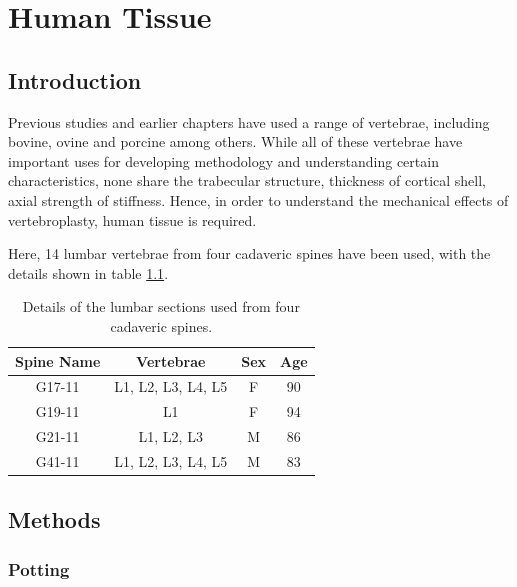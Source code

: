 \chapter{Human Tissue}

\section{Introduction}

Previous studies and earlier chapters have used a range of vertebrae, including bovine, ovine and porcine among others. While all of these vertebrae have important uses for developing methodology and understanding certain characteristics, none share the trabecular structure, thickness of cortical shell, axial strength of stiffness. Hence, in order to understand the mechanical effects of vertebroplasty, human tissue is required.

Here, 14 lumbar vertebrae from four cadaveric spines have been used, with the details shown in table \ref{tab:vertebrae}.

\begin{table}[ht!]
\centering
  \caption{Details of the lumbar sections used from four cadaveric spines.}
  \label{tab:vertebrae}
  \begin{tabular}{c|c|c|c}
    Spine Name & Vertebrae & Sex & Age \\ \hline \hline
    G17-11& L1, L2, L3, L4, L5 & F & 90\\ \hline
    G19-11& L1 & F & 94\\ \hline
    G21-11& L1, L2, L3 & M & 86\\ \hline
    G41-11& L1, L2, L3, L4, L5 & M & 83\\ \hline

  \end{tabular}

\end{table}


\section{Methods}

\subsection{Potting}

